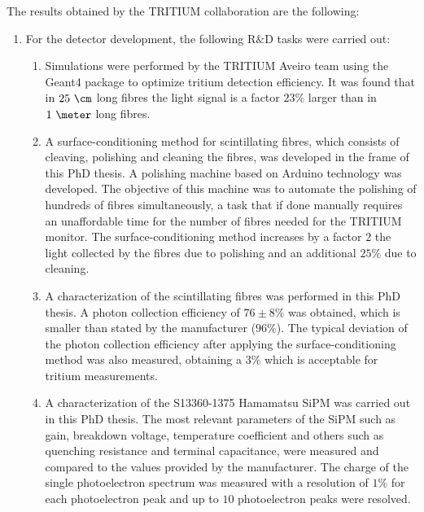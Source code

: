 The results obtained by the TRITIUM collaboration are the following:

\begin{enumerate}
\item{} For the detector development, the following R$\&$D tasks were carried out:

\begin{enumerate}
\item{} Simulations were performed by the TRITIUM Aveiro team using the Geant4 package to optimize tritium detection efficiency. It was found that in $25~\cm$ long fibres the light signal is a factor $23\%$ larger than in $1~\meter$ long fibres. %

\item{} A surface-conditioning method for scintillating fibres, which consists of cleaving, polishing and cleaning the fibres, was developed in the frame of this PhD thesis. A polishing machine based on Arduino technology was developed. The objective of this machine was to automate the polishing of hundreds of fibres simultaneously, a task that if done manually requires an unaffordable time for the number of fibres needed for the TRITIUM monitor. The surface-conditioning method increases by a factor $2$ the light collected by the fibres due to polishing and an additional $25\%$ due to cleaning. 

\item{} A characterization of the scintillating fibres was performed in this PhD thesis. A photon collection efficiency of $76\pm 8\%$ was obtained, which is smaller than stated by the manufacturer ($96\%$). The typical deviation of the photon collection efficiency after applying the surface-conditioning method was also measured, obtaining a $3\%$ which is acceptable for tritium measurements.

\item{} A characterization of the S13360-1375 Hamamatsu SiPM was carried out in this PhD thesis. The most relevant parameters of the SiPM such as gain, breakdown voltage, temperature coefficient and others such as quenching resistance and terminal capacitance, were measured and compared to the values provided by the manufacturer. The charge of the single photoelectron spectrum was measured with a resolution of $1\%$ for each photoelectron peak and up to $10$ photoelectron peaks were resolved. %


\end{enumerate}
\end{enumerate}
